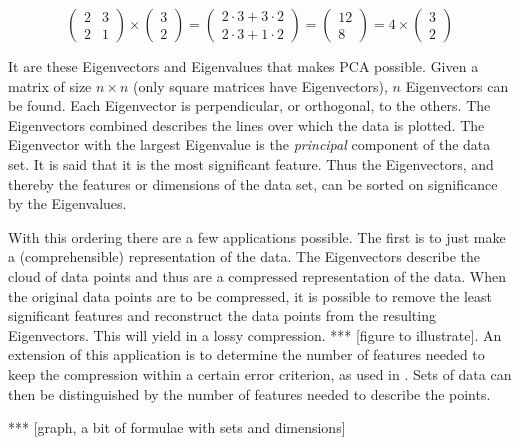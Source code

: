 \begin{equation} \label{eq:eigenvector}
	\begin{pmatrix} 2 & 3 \\ 2 & 1 \end{pmatrix}
\times
	\begin{pmatrix} 3 \\ 2 \end{pmatrix}
=
	\begin{pmatrix} 2 \cdot 3 + 3 \cdot 2 \\ 2 \cdot 3 + 1 \cdot 2
	\end{pmatrix}
=
	\begin{pmatrix} 12 \\ 8 \end{pmatrix}
=
	4 \times \begin{pmatrix} 3 \\ 2 \end{pmatrix}
\end{equation}

It are these Eigenvectors and Eigenvalues that makes PCA possible. Given a
matrix of size $n \times n$ (only square matrices have Eigenvectors), $n$
Eigenvectors can be found. Each Eigenvector is perpendicular, or orthogonal,
to the others. The Eigenvectors combined describes the lines over which the
data is plotted. The Eigenvector with the largest Eigenvalue is the
\emph{principal} component of the data set. It is said that it is the most
significant feature. Thus the Eigenvectors, and thereby the features or
dimensions of the data set, can be sorted on significance by the Eigenvalues.

With this ordering there are a few applications possible. The first is to just
make a (comprehensible) representation of the data. The Eigenvectors describe
the cloud of data points and thus are a compressed representation of the data.
When the original data points are to be compressed, it is possible to remove
the least significant features and reconstruct the data points from the
resulting Eigenvectors. This will yield in a lossy compression. *** [figure to
illustrate]. An extension of this application is to determine the number of
features needed to keep the compression within a certain error criterion, as
used in \cite{barbivc2004segmenting}. Sets of data can then be distinguished
by the number of features needed to describe the points.

*** [graph, a bit of formulae with sets and dimensions]




